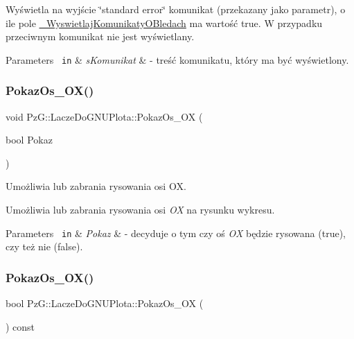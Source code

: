 Wyświetla na wyjście \char`\"{}standard error\char`\"{} komunikat (przekazany jako parametr), o ile pole \mbox{\hyperlink{class_pz_g_1_1_lacze_do_g_n_u_plota_a2f2800f14ebfe1caef0b4d30c410a7fe}{\+\_\+\+Wyswietlaj\+Komunikaty\+O\+Bledach}} ma wartość {\ttfamily true}. W przypadku przeciwnym komunikat nie jest wyświetlany. 
\begin{DoxyParams}[1]{Parameters}
\mbox{\texttt{ in}}  & {\em s\+Komunikat} & -\/ treść komunikatu, który ma być wyświetlony. \\
\hline
\end{DoxyParams}
\mbox{\label{class_pz_g_1_1_lacze_do_g_n_u_plota_a11421d7c67deab6b7524cc492407e897}} 
\subsubsection{\texorpdfstring{PokazOs\_OX()}{PokazOs\_OX()}\hspace{0.1cm}{\footnotesize\ttfamily [1/2]}}
{\footnotesize\ttfamily void Pz\+G\+::\+Lacze\+Do\+G\+N\+U\+Plota\+::\+Pokaz\+Os\+\_\+\+OX (\begin{DoxyParamCaption}\item[{bool}]{Pokaz }\end{DoxyParamCaption})\hspace{0.3cm}{\ttfamily [inline]}}



Umożliwia lub zabrania rysowania osi OX. 

Umożliwia lub zabrania rysowania osi {\itshape OX} na rysunku wykresu. 
\begin{DoxyParams}[1]{Parameters}
\mbox{\texttt{ in}}  & {\em Pokaz} & -\/ decyduje o tym czy oś {\itshape OX} będzie rysowana ({\ttfamily true}), czy też nie ({\ttfamily false}). \\
\hline
\end{DoxyParams}
\mbox{\label{class_pz_g_1_1_lacze_do_g_n_u_plota_ae112972af57167c3b053bf922bce6bbf}} 
\subsubsection{\texorpdfstring{PokazOs\_OX()}{PokazOs\_OX()}\hspace{0.1cm}{\footnotesize\ttfamily [2/2]}}
{\footnotesize\ttfamily bool Pz\+G\+::\+Lacze\+Do\+G\+N\+U\+Plota\+::\+Pokaz\+Os\+\_\+\+OX (\begin{DoxyParamCaption}{ }\end{DoxyParamCaption}) const\hspace{0.3cm}{\ttfamily [inline]}}



